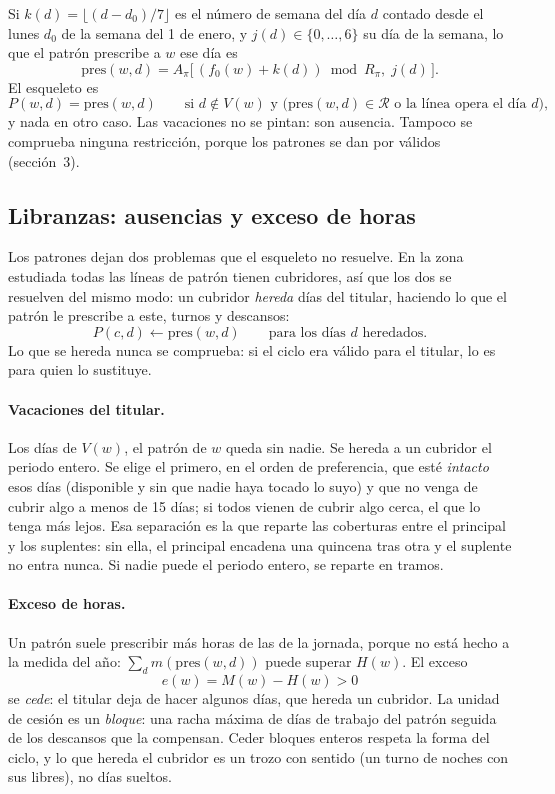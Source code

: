 \documentclass[11pt,a4paper]{article}
\newcommand{\Desc}{\mathcal{R}}
\begin{document}
Si $k(d) = \lfloor (d - d_0)/7 \rfloor$ es el número de semana del día $d$ contado desde el lunes
$d_0$ de la semana del 1 de enero, y $j(d) \in \{0,\dots,6\}$ su día de la semana, lo que el
patrón prescribe a $w$ ese día es
\[
  \mathrm{pres}(w,d) = A_\pi\bigl[\,(f_0(w) + k(d)) \bmod R_\pi,\; j(d)\,\bigr].
\]
El esqueleto es
\[
  P(w,d) = \mathrm{pres}(w,d)
  \qquad \text{si } d \notin V(w) \text{ y } \bigl(\mathrm{pres}(w,d) \in \Desc
  \text{ o la línea opera el día } d\bigr),
\]
y nada en otro caso. Las vacaciones no se pintan: son ausencia. Tampoco se comprueba ninguna
restricción, porque los patrones se dan por válidos (sección~3).

\subsection{Libranzas: ausencias y exceso de horas}

Los patrones dejan dos problemas que el esqueleto no resuelve. En la zona estudiada todas las
líneas de patrón tienen cubridores, así que los dos se resuelven del mismo modo: un cubridor
\emph{hereda} días del titular, haciendo lo que el patrón le prescribe a este, turnos y
descansos:
\[
  P(c,d) \leftarrow \mathrm{pres}(w,d) \qquad \text{para los días } d \text{ heredados}.
\]
Lo que se hereda nunca se comprueba: si el ciclo era válido para el titular, lo es para quien lo
sustituye.

\paragraph{Vacaciones del titular.} Los días de $V(w)$, el patrón de $w$ queda sin nadie. Se
hereda a un cubridor el periodo entero. Se elige el primero, en el orden de preferencia, que
esté \emph{intacto} esos días (disponible y sin que nadie haya tocado lo suyo) y que no venga de
cubrir algo a menos de 15 días; si todos vienen de cubrir algo cerca, el que lo tenga más lejos.
Esa separación es la que reparte las coberturas entre el principal y los suplentes: sin ella, el
principal encadena una quincena tras otra y el suplente no entra nunca. Si nadie puede el
periodo entero, se reparte en tramos.

\paragraph{Exceso de horas.} Un patrón suele prescribir más horas de las de la jornada, porque
no está hecho a la medida del año: $\sum_{d} m(\mathrm{pres}(w,d))$ puede superar $H(w)$. El
exceso
\[
  e(w) = M(w) - H(w) > 0
\]
se \emph{cede}: el titular deja de hacer algunos días, que hereda un cubridor. La unidad de cesión
es un \emph{bloque}: una racha máxima de días de trabajo del patrón seguida de los descansos que
la compensan. Ceder bloques enteros respeta la forma del ciclo, y lo que hereda el cubridor es un
trozo con sentido (un turno de noches con sus libres), no días sueltos.
\end{document}
